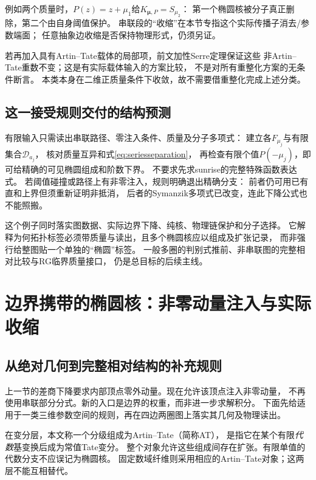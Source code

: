 \documentclass[11pt,a4paper]{ctexart}
\theoremstyle{cnplain}\newtheorem{theorem}{定理}[section]
\theoremstyle{definition}\newtheorem{definition}[theorem]{定义}
\theoremstyle{remark}\newtheorem{remark}[theorem]{注}
\begin{document}
例如两个质量时，$P(z)=z+\mu_1$给$K_{\boldsymbol\mu,P}=S_{\mu_2}$：
第一个椭圆核被分子真正删除，第二个由自身阈值保护。
串联段的“收缩”在本节专指这个实际传播子消去/参数端面；
任意抽象边收缩是否保持物理形式，仍须另证。

若再加入具有Artin--Tate载体的局部项，前文加性Serre定理保证这些
非Artin--Tate重数不变；这是有实际载体输入的方案比较，
不是对所有重整化方案的无条件断言。
本类本身在二维正质量条件下收敛，故不需要借重整化完成上述分类。

\subsection{这一接受规则交付的结构预测}
有限输入只需读出串联路径、零注入条件、质量及分子多项式：
建立各$F_{\mu_j}$与有限集合$\mathcal D_{a_j}$，
核对质量互异和式\eqref{eq:seriesseparation}，
再检查有限个值$P(-\mu_j)$，即可给精确的可见椭圆组成和阶数下界。
不要求先求sunrise的完整特殊函数表达式。
若阈值碰撞或路径上有非零注入，规则明确退出精确分支：
前者仍可用已有直和上界但须重新证明非抵消，
后者的Symanzik多项式已改变，连此下降公式也不能照搬。

这个例子同时落实图数据、实际边界下降、纯核、物理链保护和分子选择。
它解释为何拓扑标签必须带质量与读出，且多个椭圆核应以组成及扩张记录，
而非强行给整图贴一个单独的“椭圆”标签。
一般多圈的判别式推前、非串联图的完整相对比较与RG临界质量接口，
仍是总目标的后续主线。



\section{边界携带的椭圆核：非零动量注入与实际收缩}
\label{sec:boundaryelliptic}
\subsection{从绝对几何到完整相对结构的补充规则}
上一节的差商下降要求内部顶点零外动量。现在允许该顶点注入非零动量，
不再使用串联部分分式。新的入口是边界的权重，而非进一步求解积分。
下面先给适用于一类三维参数空间的规则，再在四边两圈图上落实其几何及物理读出。

在变分层，本文称一个分级组成为Artin--Tate（简称AT），
是指它在某个有限\emph{代数}基变换后成为常值Tate变分。
整个对象允许这些组成间存在扩张。有限单值的代数分支不应误记为椭圆核。
固定数域纤维则采用相应的Artin--Tate对象；这两层不能互相替代。
\end{document}
